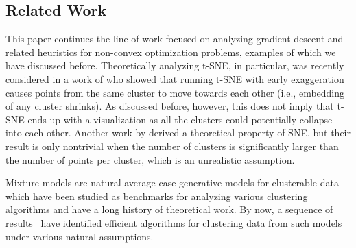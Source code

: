 

\subsection{Related Work}
This paper continues the line of work focused on analyzing gradient descent and related heuristics for non-convex optimization problems, examples of which we have discussed before. Theoretically analyzing t-SNE, in particular, was recently considered in a work of \citet{linderman2017clustering} who showed that running t-SNE with early exaggeration causes points from the same cluster to move towards each other (i.e., embedding of any cluster shrinks). As discussed before, however, this does not imply that t-SNE ends up with a visualization as all the clusters could potentially collapse into each other.
Another work by \cite{shaham2017stochastic} derived a theoretical property of SNE, but their result is only nontrivial when the number of clusters is significantly larger than the number of points per cluster, which is an unrealistic assumption.


Mixture models are natural average-case generative models for clusterable data which have been studied as benchmarks for analyzing various clustering algorithms and have a long history of theoretical work. By now, a sequence of results~\citep{DBLP:conf/soda/DasguptaHKM07,DBLP:conf/esa/DasguptaHKM06,arora2005learning,vempala2004spectral,DBLP:conf/colt/AchlioptasM05,DBLP:conf/colt/KannanSV05,DBLP:conf/colt/Vempala07,MR3385380-Hsu13,DBLP:conf/stoc/GeHK15,DBLP:journals/cacm/KalaiMV12,DBLP:conf/focs/BelkinS10,DBLP:conf/stoc/KalaiMV10,DBLP:journals/corr/abs-1711-07465,DBLP:journals/corr/abs-1711-07454,DBLP:journals/corr/abs-1711-07211} have identified efficient algorithms for clustering data from such models under various natural assumptions. %